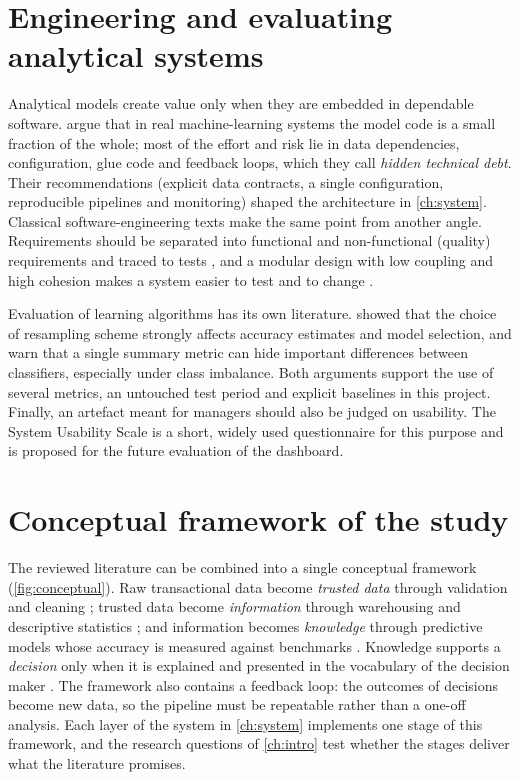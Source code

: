 \section{Engineering and evaluating analytical systems}
Analytical models create value only when they are embedded in dependable software. \citet{sculley2015} argue
that in real machine-learning systems the model code is a small fraction of the whole; most of the effort and
risk lie in data dependencies, configuration, glue code and feedback loops, which they call \emph{hidden
technical debt}. Their recommendations (explicit data contracts, a single configuration, reproducible pipelines
and monitoring) shaped the architecture in \cref{ch:system}. Classical software-engineering texts make the same
point from another angle. Requirements should be separated into functional and non-functional (quality)
requirements and traced to tests \citep{sommerville2016}, and a modular design with low coupling and high
cohesion makes a system easier to test and to change \citep{pressman2020}.

Evaluation of learning algorithms has its own literature. \citet{kohavi1995} showed that the choice of
resampling scheme strongly affects accuracy estimates and model selection, and \citet{japkowicz2011} warn that
a single summary metric can hide important differences between classifiers, especially under class imbalance.
Both arguments support the use of several metrics, an untouched test period and explicit baselines in this
project. Finally, an artefact meant for managers should also be judged on usability. The System Usability Scale
\citep{brooke1996} is a short, widely used questionnaire for this purpose and is proposed for the future
evaluation of the dashboard.

\section{Conceptual framework of the study}
The reviewed literature can be combined into a single conceptual framework (\cref{fig:conceptual}). Raw
transactional data become \emph{trusted data} through validation and cleaning \citep{garcia2015, little2019};
trusted data become \emph{information} through warehousing and descriptive statistics \citep{kimball2013}; and
information becomes \emph{knowledge} through predictive models whose accuracy is measured against benchmarks
\citep{hyndman2021, hyndman2006}. Knowledge supports a \emph{decision} only when it is explained and
presented in the vocabulary of the decision maker \citep{few2013, molnar2022}. The framework also contains a
feedback loop: the outcomes of decisions become new data, so the pipeline must be repeatable rather than a
one-off analysis. Each layer of the system in \cref{ch:system} implements one stage of this framework, and the
research questions of \cref{ch:intro} test whether the stages deliver what the literature promises.

